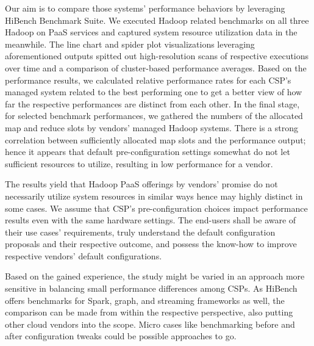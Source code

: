 \documentclass[review]{elsarticle}
\begin{document}
Our aim is to compare those systems' performance behaviors by leveraging HiBench Benchmark Suite. We executed Hadoop related benchmarks on all three Hadoop on PaaS services and captured system resource utilization data in the meanwhile. The line chart and spider plot visualizations leveraging aforementioned outputs spitted out high-resolution scans of respective executions over time and a comparison of cluster-based performance averages. Based on the performance results, we calculated relative performance rates for each CSP's managed system related to the best performing one to get a better view of how far the respective performances are distinct from each other. In the final stage, for selected benchmark performances, we gathered the numbers of the allocated map and reduce slots by vendors' managed Hadoop systems. There is a strong correlation between sufficiently allocated map slots and the performance output; hence it appears that default  pre-configuration settings somewhat do not let sufficient resources to utilize, resulting in low performance for a vendor.

The results yield that Hadoop PaaS offerings by vendors' promise do not necessarily utilize system resources in similar ways hence may highly distinct in some cases. We assume that CSP's pre-configuration choices impact performance results even with the same hardware settings. The end-users shall be aware of their use cases' requirements, truly understand the default configuration proposals and their respective outcome, and possess the know-how to improve respective vendors' default configurations.

Based on the gained experience, the study might be varied in an approach more sensitive in balancing small performance differences among CSPs. As HiBench offers benchmarks for Spark, graph, and streaming frameworks as well, the comparison can be made from within the respective perspective, also putting other cloud vendors into the scope. Micro cases like benchmarking before and after configuration tweaks could be possible approaches to go.


\end{document}
